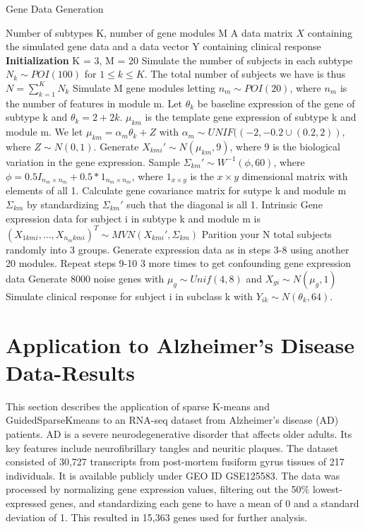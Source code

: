 \documentclass{statsoc}
\begin{document}
\begin{algorithm}
    \caption{Gene Data Generation}
    \begin{algorithmic}[1]
        \INPUT Number of subtypes K, number of gene modules M
        \OUTPUT A data matrix $X$ containing the simulated gene data and a data vector Y containing clinical response
        \STATE \textbf{Initialization} K = 3, M = 20
        \STATE Simulate the number of subjects in each subtype $N_k \sim POI(100)$ for $1 \leq k \leq K$. The total number of subjects we have is thus $N = \sum_{k=1}^K N_k$
        \STATE Simulate M gene modules letting $n_m \sim POI(20)$, where $n_m$ is the number of features in module m.
        \STATE Let $\theta_k$ be baseline expression of the gene of subtype k and $\theta_k = 2 + 2k$. $\mu_{km}$ is the template gene expression of subtype k and module m. We let $\mu_{km} = \alpha_m\theta_k + Z$ with $\alpha_m \sim UNIF((-2,-0.2 \cup (0.2,2))$, where $Z \sim N(0,1)$.
        \STATE Generate $X_{kmi}' \sim N(\mu_{km}, 9)$, where 9 is the biological variation in the gene expression. 
        \STATE Sample $\Sigma_{km}' \sim W^{-1}(\phi, 60)$, where $\phi = 0.5 I_{n_m \times n_m} + 0.5*1_{n_m\times n_m}$, where $1_{x\times y}$ is the $x\times y$ dimensional matrix with elements of all 1.
        \STATE Calculate gene covariance matrix for sutype k and module m $\Sigma_{km}$ by standardizing $\Sigma_{km}'$ such that the diagonal is all 1.
        \STATE Intrinsic Gene expression data for subject i in subtype k and module m is $(X_{1kmi}, \ldots, X_{n_mkmi})^T \sim MVN(X_{kmi}', \Sigma_{km})$
        \STATE Parition your N total subjects randomly into 3 groups.
        \STATE Generate expression data as in steps 3-8 using another 20 modules.
        \STATE Repeat steps 9-10 3 more times to get confounding gene expression data
        \STATE Generate 8000 noise genes with $\mu_g \sim Unif(4,8)$ and $X_{gi} \sim N(\mu_g, 1)$
        \STATE Simulate clinical response for subject i in subclass k with $Y_{ik} \sim N(\theta_k, 64)$.
    \end{algorithmic}
\end{algorithm}

\section{Application to Alzheimer’s Disease Data-Results}

This section describes the application of sparse K-means and GuidedSparseKmeans to an RNA-seq dataset from Alzheimer’s disease (AD) patients. AD is a severe neurodegenerative disorder that affects older adults. Its key features include neurofibrillary tangles and neuritic plaques. The dataset consisted of 30,727 transcripts from post-mortem fusiform gyrus tissues of 217 individuals. It is available publicly under GEO ID GSE125583. The data was processed by normalizing gene expression values, filtering out the 50\% lowest-expressed genes, and standardizing each gene to have a mean of 0 and a standard deviation of 1. This resulted in 15,363 genes used for further analysis.
\end{document}
